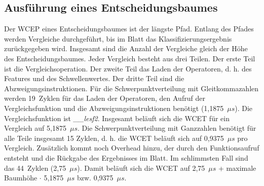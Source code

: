 \subsection{Ausführung eines Entscheidungsbaumes}
Der WCEP eines Entscheidungsbaumes ist der längste Pfad. Entlang des Pfades werden Vergleiche durchgeführt, bis im Blatt das Klassifizierungsergebnis zurückgegeben wird. Insgesamt sind die Anzahl der Vergleiche gleich
der Höhe des Entscheidungsbaumes.
\newline
\newline
Jeder Vergleich besteht aus drei Teilen. Der erste Teil ist die Vergleichsoperation. Der zweite Teil das Laden der Operatoren, d. h. des Features und des Schwellenwertes. Der dritte Teil sind die Abzweigungsinstruktionen. Für
die Schwerpunktverteilung mit Gleitkommazahlen werden 19~Zyklen für das Laden der Operatoren, den Aufruf der Vergleichsfunktion und die Abzweigungsinstruktionen benötigt (1,1875~$\mu s$). Die Vergleichsfunktion ist
\textit{\_\_lesf2}. Insgesamt beläuft sich die WCET für ein Vergleich auf 5,1875~$\mu s$. Die Schwerpunktverteilung mit Ganzzahlen benötigt für alle Teile insgesamt 15 Zyklen, d. h. die WCET beläuft sich
auf 0,9375~$\mu s$ pro Vergleich.
\newline
\newline
Zusätzlich kommt noch Overhead hinzu, der durch den Funktionsaufruf entsteht und die Rückgabe des Ergebnisses im Blatt. Im schlimmsten Fall sind das 44~Zyklen (2,75~$\mu s$). Damit beläuft sich die WCET auf
2,75~$\mu s$ + maximale Baumhöhe $\cdot$ 5,1875~$\mu s$ bzw. 0,9375~$\mu s$.